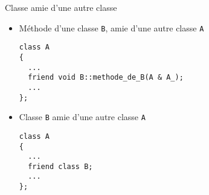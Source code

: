 \documentclass[c]{beamer}
\begin{document}
\begin{frame}[fragile,label={sec:orgheadline15}]{Classe amie d'une autre classe}
 \begin{itemize}
\item Méthode d'une classe \texttt{B}, amie d'une autre classe \texttt{A}

\begin{verbatim}
class A
{
  ...
  friend void B::methode_de_B(A & A_);
  ...
};
\end{verbatim}

\item Classe \texttt{B} amie d'une autre classe \texttt{A}

\begin{verbatim}
class A
{
  ...
  friend class B;
  ...
};
\end{verbatim}
\end{itemize}
\end{frame}
\end{document}
